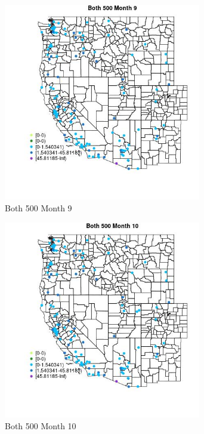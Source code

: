 \begin{figure} 
\centering  
\includegraphics[width=0.77\textwidth]{Code_Outputs/Report_ML_input_PM25_Step4_part_e_de_duplicated_aves_MapObsMo9Both_500.jpg} 
\caption{\label{fig:Report_ML_input_PM25_Step4_part_e_de_duplicated_avesMapObsMo9Both_500}Both 500 Month 9} 
\end{figure} 
 

\begin{figure} 
\centering  
\includegraphics[width=0.77\textwidth]{Code_Outputs/Report_ML_input_PM25_Step4_part_e_de_duplicated_aves_MapObsMo10Both_500.jpg} 
\caption{\label{fig:Report_ML_input_PM25_Step4_part_e_de_duplicated_avesMapObsMo10Both_500}Both 500 Month 10} 
\end{figure} 
 

